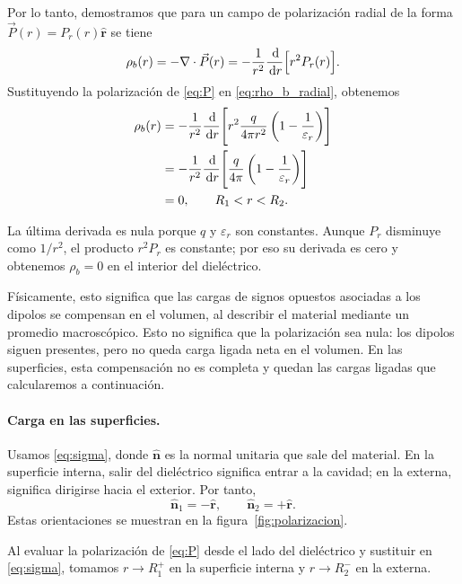 \documentclass[11pt]{article}
\newcommand{\er}{\hat{\mathbf r}}
\newcommand{\normal}{\hat{\mathbf n}}
\newcommand{\dd}{\,\mathrm d}
\begin{document}
Por lo tanto, demostramos que para un campo de polarización
radial de la forma $\vec P(r)=P_r(r)\er$ se tiene
\begin{equation}
  \rho_b(r)
    =-\nabla\cdot\vec P(r)=-\frac{1}{r^2}\frac{\dd}{\dd r}
      \Bigl[r^2P_r(r)\Bigr].
  \label{eq:rho_b_radial}
\end{equation}
Sustituyendo la polarización de \eqref{eq:P}
en \eqref{eq:rho_b_radial}, obtenemos
\begin{align}
  \rho_b(r)
    &=-\frac{1}{r^2}\frac{\dd}{\dd r}
      \Biggl[
        r^2\frac{q}{4\pi r^2}
        \left(1-\frac{1}{\varepsilon_r}\right)
      \Biggr]
      \notag\\
    &=-\frac{1}{r^2}\frac{\dd}{\dd r}
      \Biggl[
        \frac{q}{4\pi}
        \left(1-\frac{1}{\varepsilon_r}\right)
      \Biggr]
      \notag\\
    &=0,
      \qquad R_1<r<R_2.
      \label{eq:rho_b_material}
\end{align}

La última derivada es nula porque $q$ y $\varepsilon_r$ son
constantes. Aunque $P_r$ disminuye como $1/r^2$, el producto
$r^2P_r$ es constante; por eso su derivada es cero y obtenemos
$\rho_b=0$ en el interior del dieléctrico.

Físicamente, esto significa que las cargas de signos opuestos
asociadas a los dipolos se compensan en el volumen, al describir
el material mediante un promedio macroscópico. Esto no significa
que la polarización sea nula: los dipolos siguen presentes,
pero no queda carga ligada neta en el volumen. En las superficies,
esta compensación no es completa y quedan las cargas ligadas
que calcularemos a continuación.

\paragraph{Carga en las superficies.}

Usamos \eqref{eq:sigma}, donde $\normal$ es la normal unitaria
que sale del material. En la superficie interna, salir del
dieléctrico significa entrar a la cavidad; en la externa,
significa dirigirse hacia el exterior. Por tanto,
\[
  \normal_1=-\er,
  \qquad
  \normal_2=+\er.
\]
Estas orientaciones se muestran en la
figura~\ref{fig:polarizacion}.

Al evaluar la polarización de \eqref{eq:P} desde el lado
del dieléctrico y sustituir en \eqref{eq:sigma}, tomamos
$r\to R_1^+$ en la superficie interna y $r\to R_2^-$
en la externa.
\end{document}
